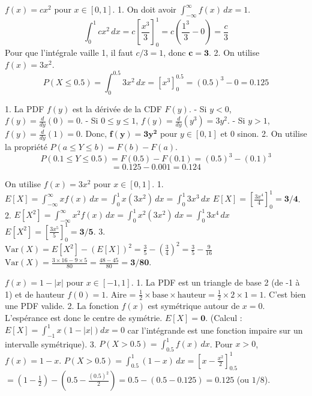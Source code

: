 
\begin{correctionbox}
$f(x) = c x^2$ pour $x \in [0, 1]$.
1.  On doit avoir $\int_{-\infty}^{\infty} f(x) \, dx = 1$.
    $$ \int_0^1 c x^2 \, dx = c \left[ \frac{x^3}{3} \right]_0^1 = c \left( \frac{1^3}{3} - 0 \right) = \frac{c}{3} $$
    Pour que l'intégrale vaille 1, il faut $c/3 = 1$, donc $\mathbf{c=3}$.
2.  On utilise $f(x) = 3x^2$.
    $$ P(X \le 0.5) = \int_0^{0.5} 3x^2 \, dx = \left[ x^3 \right]_0^{0.5} = (0.5)^3 - 0 = 0.125 $$
\end{correctionbox}

\begin{correctionbox}
1.  La PDF $f(y)$ est la dérivée de la CDF $F(y)$.
    - Si $y < 0$, $f(y) = \frac{d}{dy}(0) = 0$.
    - Si $0 \le y \le 1$, $f(y) = \frac{d}{dy}(y^3) = 3y^2$.
    - Si $y > 1$, $f(y) = \frac{d}{dy}(1) = 0$.
    Donc, $\mathbf{f(y) = 3y^2}$ pour $y \in [0, 1]$ et 0 sinon.
2.  On utilise la propriété $P(a \le Y \le b) = F(b) - F(a)$.
    $$ P(0.1 \le Y \le 0.5) = F(0.5) - F(0.1) = (0.5)^3 - (0.1)^3 $$
    $$ = 0.125 - 0.001 = 0.124 $$
\end{correctionbox}

\begin{correctionbox}
On utilise $f(x) = 3x^2$ pour $x \in [0, 1]$.
1.  $E[X] = \int_{-\infty}^{\infty} x f(x) \, dx = \int_0^1 x (3x^2) \, dx = \int_0^1 3x^3 \, dx$
    $E[X] = \left[ \frac{3x^4}{4} \right]_0^1 = \mathbf{3/4}$.
2.  $E[X^2] = \int_{-\infty}^{\infty} x^2 f(x) \, dx = \int_0^1 x^2 (3x^2) \, dx = \int_0^1 3x^4 \, dx$
    $E[X^2] = \left[ \frac{3x^5}{5} \right]_0^1 = \mathbf{3/5}$.
3.  $\text{Var}(X) = E[X^2] - (E[X])^2 = \frac{3}{5} - \left(\frac{3}{4}\right)^2 = \frac{3}{5} - \frac{9}{16}$
    $\text{Var}(X) = \frac{3 \times 16 - 9 \times 5}{80} = \frac{48 - 45}{80} = \mathbf{3/80}$.
\end{correctionbox}

\begin{correctionbox}
$f(x) = 1 - |x|$ pour $x \in [-1, 1]$.
1.  La PDF est un triangle de base 2 (de -1 à 1) et de hauteur $f(0)=1$.
    Aire = $\frac{1}{2} \times \text{base} \times \text{hauteur} = \frac{1}{2} \times 2 \times 1 = 1$. C'est bien une PDF valide.
2.  La fonction $f(x)$ est symétrique autour de $x=0$. L'espérance est donc le centre de symétrie.
    $E[X] = \mathbf{0}$.
    (Calcul : $E[X] = \int_{-1}^1 x(1-|x|)dx = 0$ car l'intégrande est une fonction impaire sur un intervalle symétrique).
3.  $P(X > 0.5) = \int_{0.5}^1 f(x) \, dx$. Pour $x>0$, $f(x) = 1-x$.
    $P(X > 0.5) = \int_{0.5}^1 (1-x) \, dx = \left[ x - \frac{x^2}{2} \right]_{0.5}^1$
    $= \left(1 - \frac{1}{2}\right) - \left(0.5 - \frac{(0.5)^2}{2}\right) = 0.5 - (0.5 - 0.125) = \mathbf{0.125}$ (ou $1/8$).
\end{correctionbox}

